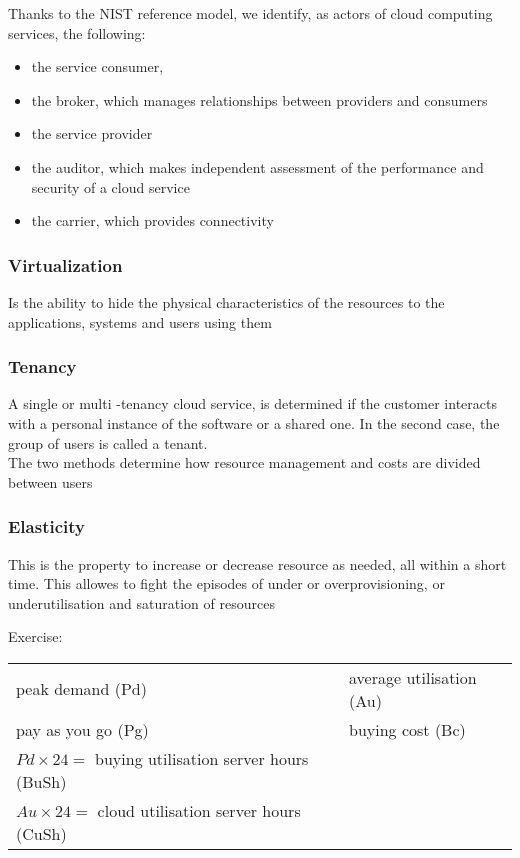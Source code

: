 \documentclass[12pt, a4paper]{article}
\begin{document}
Thanks to the NIST reference model, we identify, as actors of cloud computing services, the following:
\begin{itemize}
    \item the service consumer,
    \item the broker, which manages relationships between providers and consumers
    \item the service provider
    \item the auditor, which makes independent assessment of the performance and security of a cloud service
    \item the carrier, which provides connectivity
\end{itemize} 

\subsubsection{Virtualization}
Is the ability to hide the physical characteristics of the resources to the applications, systems and users
using them

\subsubsection{Tenancy}
A single or multi -tenancy cloud service, is determined if the customer interacts with a personal instance of 
the software or a shared one. In the second case, the group of users is called a tenant.\\ The two methods 
determine how resource management and costs are divided between users

\subsubsection{Elasticity}
This is the property to increase or decrease resource as needed, all within a short time. This allowes to 
fight the episodes of under or overprovisioning, or underutilisation and saturation of resources

Exercise:\\
\begin{center}
    \begin{tabular}{l l}
        peak demand (Pd) & average utilisation (Au)    \\
        pay as you go (Pg) & buying cost (Bc) \\
        $Pd\times 24 = $ buying utilisation server hours (BuSh) & \\
        $Au\times 24 = $ cloud utilisation server hours (CuSh) &\\
    \end{tabular}
\end{center}
\end{document}
